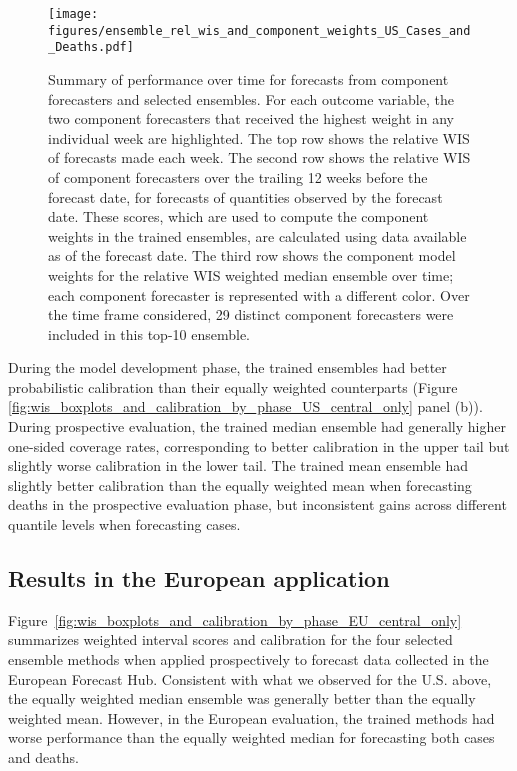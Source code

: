 \documentclass[11pt,3p,review,authoryear]{elsarticle}
\begin{document}
\begin{figure}
\texttt{[image: figures/ensemble\_rel\_wis\_and\_component\_weights\_US\_Cases\_and\_Deaths.pdf]}
\caption{Summary of performance over time for forecasts from component forecasters and selected ensembles. For each outcome variable, the two component forecasters that received the highest weight in any individual week are highlighted. The top row shows the relative WIS of forecasts made each week. The second row shows the relative WIS of component forecasters over the trailing 12 weeks before the forecast date, for forecasts of quantities observed by the forecast date. These scores, which are used to compute the component weights in the trained ensembles, are calculated using data available as of the forecast date. The third row shows the component model weights for the relative WIS weighted median ensemble over time; each component forecaster is represented with a different color. Over the time frame considered, 29 distinct component forecasters were included in this top-10 ensemble.}
\label{fig:component_weights}
\end{figure}

During the model development phase, the trained ensembles had better probabilistic calibration than their equally weighted counterparts (Figure \ref{fig:wis_boxplots_and_calibration_by_phase_US_central_only} panel (b)).
During prospective evaluation, the trained median ensemble had generally higher one-sided coverage rates, corresponding to better calibration in the upper tail but slightly worse calibration in the lower tail.
The trained mean ensemble had slightly better calibration than the equally weighted mean when forecasting deaths in the prospective evaluation phase, but inconsistent gains across different quantile levels when forecasting cases.

\subsection{Results in the European application}
\label{subsec:results_eu}

Figure~\ref{fig:wis_boxplots_and_calibration_by_phase_EU_central_only} summarizes weighted interval scores and calibration for the four selected ensemble methods when applied prospectively to forecast data collected in the European Forecast Hub. Consistent with what we observed for the U.S. above, the equally weighted median ensemble was generally better than the equally weighted mean. However, in the European evaluation, the trained methods had worse performance than the equally weighted median for forecasting both cases and deaths.
\end{document}
